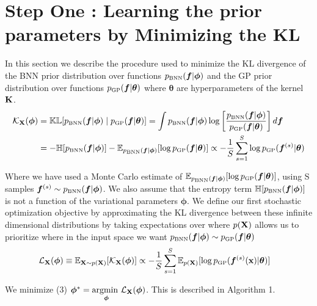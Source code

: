 \documentclass{article}
\begin{document}
\section{ Step One : Learning the prior parameters by Minimizing the KL}
In this section we describe the procedure used to minimize the KL divergence of  
the BNN prior distribution over functions $\pbnn (\bm f |  \bm \phi ) $ and
the GP prior distribution over functions  $\pgp (\bm f | \bm \theta )$ 
where $\bm \theta$ are hyperparameters of the kernel $ \mathbf{K} $. 
\begin{align}
    \mathcal K_\X (\bm \phi)&= 
    \kl [\pbnn (\bm f |  \bm \phi ) \mid   \pgp (\bm f | \bm \theta )] 
    = \int\pbnn (\bm f |  \bm \phi ) \log \BB{\frac{\pbnn (\bm f |  \bm \phi ) }{   \pgp (\bm f | \bm \theta )}} d\bm f  \\
    &= -\entropy [\pbnn (\bm f |  \bm \phi ) ] 
       - \E_{\pbnn (\bm f |  \bm \phi ) } [\log \pgp (\bm f | \bm \theta ) ] 
    \propto -\frac{1}{S} \sum_{s=1}^S \log \pgp (\bm f ^{(s)}| \bm \theta ) 
\end{align}

Where we have used a Monte Carlo estimate of 
$ \E_{\pbnn (\bm f |  \bm \phi ) } [\log \pgp (\bm f | \bm \theta ) ]$, 
using S samples $ \bm f ^{(s)} \sim  \pbnn (\bm f |  \bm \phi )$.
We also assume that the entropy term $\entropy [\pbnn (\bm f |  \bm \phi ) ]$ 
is not a function of the variational parameters $\bm \phi$.
We define our first stochastic optimization objective by approximating the KL divergence between these infinite dimensional distributions by taking expectations over where $p( \mathbf{X} )$ allows us to prioritize where in the input space we want 
$\pbnn (\bm f |  \bm \phi ) \sim \pgp (\bm f | \bm \theta ) $
\begin{align}
     \elbo _\X (\bm \phi)
     &\equiv \E _{\X \sim p(\X)} [\mathcal K_\X (\bm \phi) ]
     \propto - \frac{1}{S} \sum_{s=1}^S  \E_{p(\B X)} [\log \pgp (\bm f ^{(s)}(\B x)| \bm \theta )] 
\end{align}

We minimize (3) $ \bm \phi ^* =  \underset{\bm \phi}{\text{argmin }}  \mathcal{L} _{ \mathbf{X} } (\bm \phi ) $.
This is described in Algorithm 1. 
\end{document}
